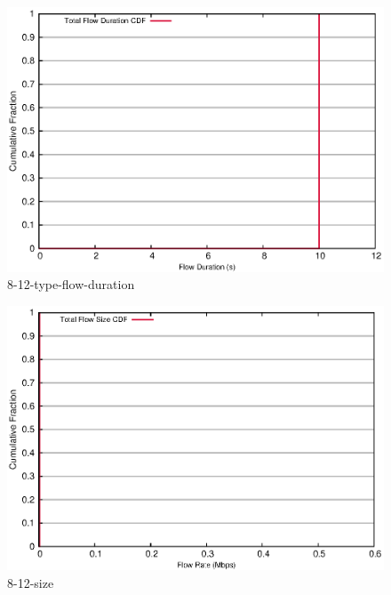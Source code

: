 \documentclass[landscape]{article}
\begin{document}

\begin{figure}[!hbt]
\centering
\includegraphics[width=1\textwidth]{8-12-type-flow-duration.eps}
\caption{8-12-type-flow-duration}
\end{figure}


\newpage

\begin{figure}[!hbt]
\centering
\includegraphics[width=1\textwidth]{8_12_flow_size.eps}
\caption{8-12-size}
\end{figure}


\newpage
\end{document}
